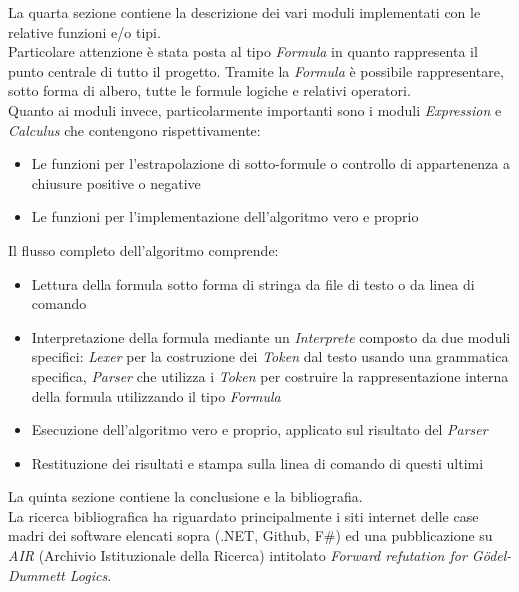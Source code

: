 \documentclass{oist}
\begin{document}
La quarta sezione contiene la descrizione dei vari moduli implementati con le relative funzioni e/o tipi. \\
Particolare attenzione è stata posta al tipo \textit{Formula} in quanto rappresenta il punto centrale di tutto il progetto. Tramite la \textit{Formula} è possibile rappresentare, sotto forma di albero, tutte le formule logiche e relativi operatori. \\
Quanto ai moduli invece, particolarmente importanti sono i moduli \textit{Expression} e \textit{Calculus} che contengono rispettivamente:
\begin{itemize}
    \item Le funzioni per l'estrapolazione di sotto-formule o controllo di appartenenza a chiusure positive o negative
    \item Le funzioni per l'implementazione dell'algoritmo vero e proprio
\end{itemize}
Il flusso completo dell'algoritmo comprende:
\begin{itemize}
    \item Lettura della formula sotto forma di stringa da file di testo o da linea di comando
    \item Interpretazione della formula mediante un \textit{Interprete} composto da due moduli specifici: \textit{Lexer} per la costruzione dei \textit{Token} dal testo usando una grammatica specifica, \textit{Parser} che utilizza i \textit{Token} per costruire la rappresentazione interna della formula utilizzando il tipo \textit{Formula}
    \item Esecuzione dell'algoritmo vero e proprio, applicato sul risultato del \textit{Parser}
    \item Restituzione dei risultati e stampa sulla linea di comando di questi ultimi
\end{itemize}

La quinta sezione contiene la conclusione e la bibliografia. \\
La ricerca bibliografica ha riguardato principalmente i siti internet delle case madri dei software elencati sopra (.NET, Github, F\#) ed una pubblicazione su \textit{AIR} (Archivio Istituzionale della Ricerca) intitolato \textit{Forward refutation for G\"odel-Dummett Logics}. \\
\end{document}
